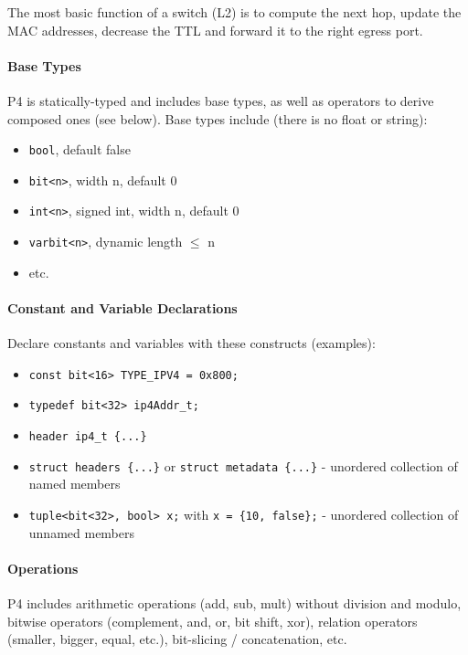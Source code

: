 The most basic function of a switch (L2) is to compute the next hop, update the MAC addresses, decrease the TTL and forward it to the right egress port.

\paragraph{Base Types}
P4 is statically-typed and includes base types, as well as operators to derive composed ones (see below). Base types include (there is no float or string):

\begin{itemize}
    \item \texttt{bool}, default false
    \item \texttt{bit<n>}, width n, default 0
    \item \texttt{int<n>}, signed int, width n, default 0
    \item \texttt{varbit<n>}, dynamic length $\leq$ n
    \item etc.
\end{itemize}


\paragraph{Constant and Variable Declarations}
Declare constants and variables with these constructs (examples): 

\begin{itemize}
    \item \texttt{const bit<16> TYPE\_IPV4 = 0x800;}
    \item \texttt{typedef bit<32> ip4Addr\_t;}
    \item \texttt{header ip4\_t \{...\}}
    \item \texttt{struct headers \{...\}} or \texttt{struct metadata \{...\}} - unordered collection of named members
    \item \texttt{tuple<bit<32>, bool> x;} with \texttt{x = \{10, false\};} - unordered collection of unnamed members
\end{itemize}



\paragraph{Operations}
P4 includes arithmetic operations (add, sub, mult) without division and modulo, bitwise operators (complement, and, or, bit shift, xor), relation operators (smaller, bigger, equal, etc.), bit-slicing / concatenation, etc. 

